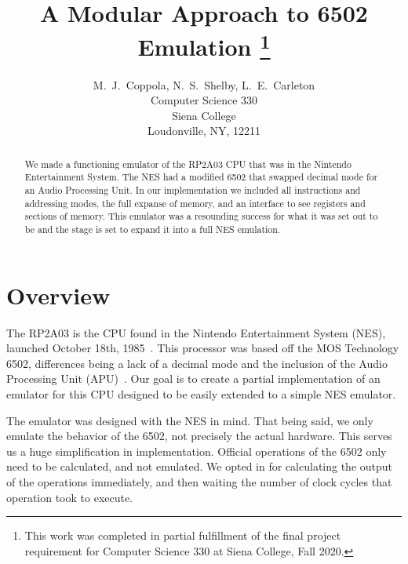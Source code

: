 \documentclass[12pt]{article}
\newcommand{\doublespace}{
  \protect\renewcommand\baselinestretch{1.5}
  \protect\normalsize
}
\begin{document}
\date{}

\title{A Modular Approach to 6502 Emulation
\footnote{This work was completed in partial fulfillment of the final
project requirement for Computer Science 330 at Siena College, Fall 2020.}}

\author{M.~J.~Coppola, N.~S.~Shelby, L.~E.~Carleton\\
Computer Science 330\\
Siena College\\
Loudonville, NY, 12211
}

\maketitle
\thispagestyle{empty}

\begin{abstract}
We made a functioning emulator of the RP2A03 CPU that was in the Nintendo Entertainment System. The NES had a 
modified 6502 that swapped decimal mode for an Audio Processing Unit. In our implementation we included all instructions
and addressing modes, the full expanse of memory, and an interface to see registers and sections of memory. This emulator 
was a resounding success for what it was set out to be and the stage is set to expand it into a full NES emulation.
\end{abstract}

\doublespace
\section{Overview}
\label{sec:overview}
The RP2A03 is the CPU found in the Nintendo Entertainment System (NES), launched October 18th, 1985~\cite{nesdev_CPU, wikipediaNES}.
This processor was based off the MOS Technology 6502, differences being a lack of a decimal mode
and the inclusion of the Audio Processing Unit (APU)~\cite{nesdev_CPU}. Our goal is to create a partial implementation
of an emulator for this CPU designed to be easily extended to a simple NES emulator. 

The emulator was designed with the NES in mind. That being said, we only emulate the behavior of
the 6502, not precisely the actual hardware. This serves us a huge simplification in implementation.
Official operations of the 6502 only need to be calculated, and not emulated. We opted in for calculating
the output of the operations immediately, and then waiting the number of clock cycles that operation
took to execute.
\end{document}
